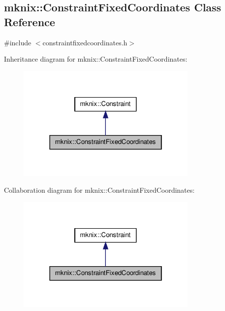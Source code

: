 \hypertarget{classmknix_1_1_constraint_fixed_coordinates}{\subsection{mknix\-:\-:Constraint\-Fixed\-Coordinates Class Reference}
\label{classmknix_1_1_constraint_fixed_coordinates}
}


{\ttfamily \#include $<$constraintfixedcoordinates.\-h$>$}



Inheritance diagram for mknix\-:\-:Constraint\-Fixed\-Coordinates\-:\nopagebreak
\begin{figure}[H]
\begin{center}
\leavevmode
\includegraphics[width=250pt]{dd/da5/classmknix_1_1_constraint_fixed_coordinates__inherit__graph}
\end{center}
\end{figure}


Collaboration diagram for mknix\-:\-:Constraint\-Fixed\-Coordinates\-:\nopagebreak
\begin{figure}[H]
\begin{center}
\leavevmode
\includegraphics[width=250pt]{d5/d3d/classmknix_1_1_constraint_fixed_coordinates__coll__graph}
\end{center}
\end{figure}
